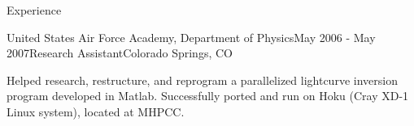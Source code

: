 \begin{rSection}{Experience}
\begin{rSubsection}{United States Air Force Academy, Department of Physics}{May 2006 - May 2007}{Research Assistant}{Colorado Springs, CO}
\item Helped research, restructure, and reprogram a parallelized lightcurve inversion program developed in Matlab.
Successfully ported and run on Hoku (Cray XD-1 Linux system), located at MHPCC.
\end{rSubsection}


\end{rSection}
